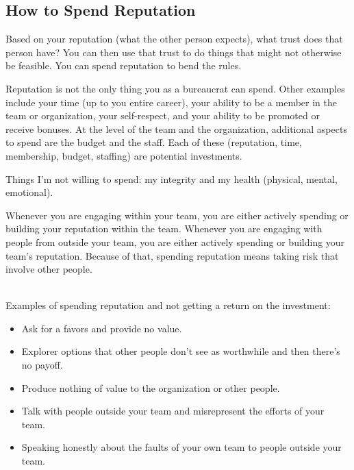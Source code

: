 \subsection*{How to Spend Reputation}

Based on your reputation (what the other person expects), what trust does that person have?  You can then use that trust to do things that might not otherwise be feasible. You can spend reputation to bend the rules. 

Reputation is not the only thing you as a bureaucrat can spend. Other examples include your time (up to you entire career), your ability to be a member in the team or organization, your self-respect, and your ability to be promoted or receive bonuses. At the level of the team and the organization, additional aspects to spend are the budget and the staff. Each of these (reputation, time, membership, budget, staffing) are potential investments. 

Things I'm not willing to spend: my integrity and my health (physical, mental, emotional).


Whenever you are engaging within your team, you are either actively spending or building your reputation within the team.
Whenever you are engaging with people from outside your team, you are either actively spending or building your team's reputation.
Because of that, spending reputation means taking risk that involve other people.

\ \\

Examples of spending reputation and not getting a return on the investment:
\begin{itemize}
    \item Ask for a favors and provide no value.
    \item Explorer options that other people don't see as worthwhile and then there's no payoff.
    \item Produce nothing of value to the organization or other people.
    \item Talk with people outside your team and misrepresent the efforts of your team.
    \item Speaking honestly about the faults of your own team to people outside your team.
\end{itemize}












